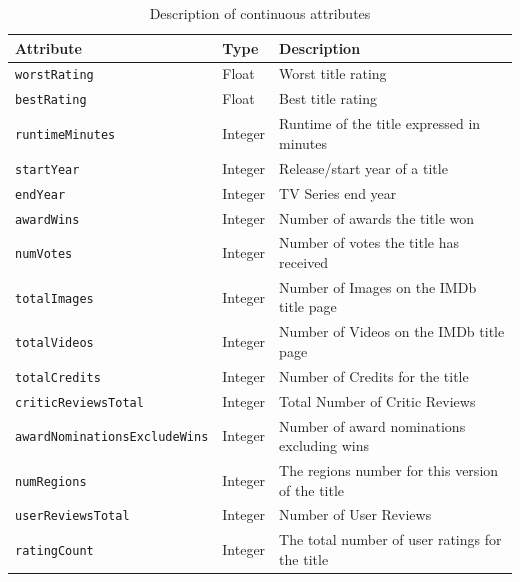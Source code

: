 \begin{table}[h]
    \centering             
    

    \begin{tabular}{|l|l|l|} 
        \hline
        \textbf{Attribute} & \textbf{Type} & \textbf{Description} \\
        \hline
        \texttt{worstRating} & Float & Worst title rating \\ 
        \hline
        \texttt{bestRating} & Float & Best title rating \\ 
        \hline
        \texttt{runtimeMinutes} & Integer & Runtime of the title expressed in minutes \\ 
        \hline
        \texttt{startYear} & Integer & Release/start year of a title \\ 
        \hline
        \texttt{endYear} & Integer & TV Series end year \\
        \hline
        \texttt{awardWins} & Integer & Number of awards the title won \\ 
        \hline
        \texttt{numVotes} & Integer & Number of votes the title has received \\ 
        \hline
        \texttt{totalImages} & Integer & Number of Images on the IMDb title page \\ 
        \hline
        \texttt{totalVideos} & Integer & Number of Videos on the IMDb title page \\ 
        \hline
        \texttt{totalCredits} & Integer & Number of Credits for the title \\ 
        \hline
        \texttt{criticReviewsTotal} & Integer & Total Number of Critic Reviews \\ 
        \hline
        \texttt{awardNominationsExcludeWins} & Integer & Number of award nominations excluding wins \\ 
        \hline
        \texttt{numRegions} & Integer & The regions number for this version of the title \\ 
        \hline
        \texttt{userReviewsTotal} & Integer & Number of User Reviews \\ 
        \hline
        \texttt{ratingCount} & Integer & The total number of user ratings for the title \\ 
        \hline
    \end{tabular}
    \caption{Description of continuous attributes}
    \label{tab:numerical_attributes}
\end{table}


